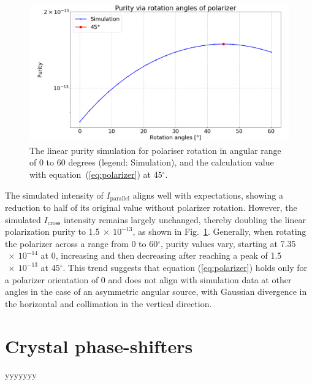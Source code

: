 \documentclass{iucr}
\begin{document}
\begin{figure}\label{fig:polarizer}
\centering
\includegraphics[width=0.95\linewidth]{figures/polarizer.png}
\caption{The linear purity simulation for polariser rotation in angular range of 0 to 60 degrees (legend: Simulation), and the calculation value with equation~(\ref{eq:polarizer}) at 45$^\circ$.}
\end{figure}

The simulated intensity of  $I_\text{parallel}$ aligns well with expectations, showing a reduction to half of its original value without polarizer rotation.
However, the simulated $I_\text{cross}$ intensity remains largely unchanged, thereby doubling the linear polarization purity to 1.5$~\times~10^{-13}$, as shown in Fig.~\ref{fig:polarizer}.
Generally, when rotating the polarizer across a range from 0 to 60$^\circ$, purity values vary, starting at 7.35$~\times~10^{-14}$ at 0, increasing and then decreasing after reaching a peak of 1.5$~\times~10^{-13}$ at 45$^\circ$.
This trend suggests that equation (\ref{eq:polarizer}) holds only for a polarizer orientation of 0 and does not align with simulation data at other angles in the case of an asymmetric angular source, with Gaussian divergence in the horizontal and collimation in the vertical direction.

\section{Crystal phase-shifters}\label{sec:phasesifters}

yyyyyyy


\end{document}
